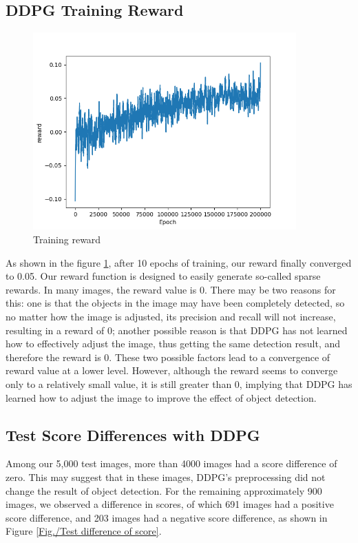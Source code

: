 \documentclass[PhD]{PHlab-thesis}
\begin{document}
\subsection{DDPG Training Reward}
\begin{figure}[!htb] 
    \centering 
    \includegraphics[width=0.9\textwidth]{images/training reward.png}
    \caption{Training reward} 
    \label{Fig.Training reward} 
\end{figure}
As shown in the figure \ref{Fig.Training reward}, after 10 epochs of training, our reward finally converged to 0.05. Our reward function is designed to easily generate so-called sparse rewards. In many images, the reward value is 0. There may be two reasons for this: one is that the objects in the image may have been completely detected, so no matter how the image is adjusted, its precision and recall will not increase, resulting in a reward of 0; another possible reason is that DDPG has not learned how to effectively adjust the image, thus getting the same detection result, and therefore the reward is 0. These two possible factors lead to a convergence of reward value at a lower level. However, although the reward seems to converge only to a relatively small value, it is still greater than 0, implying that DDPG has learned how to adjust the image to improve the effect of object detection.

\subsection{Test Score Differences with DDPG}

Among our 5,000 test images, more than 4000 images had a score difference of zero. This may suggest that in these images, DDPG's preprocessing did not change the result of object detection. For the remaining approximately 900 images, we observed a difference in scores, of which 691 images had a positive score difference, and 203 images had a negative score difference, as shown in Figure \ref{Fig./Test difference of score}.
\end{document}
